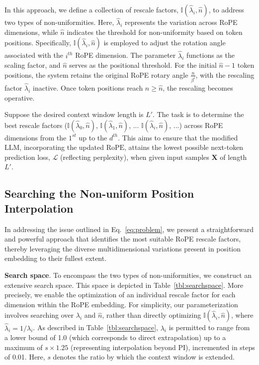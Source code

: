 In this approach, we define a collection of rescale factors, $\mathbb{I}(\hat{\lambda}_{i},\hat{n})$, to address two types of non-uniformities. Here, $\hat{\lambda}_{i}$ represents the variation across RoPE dimensions, while $\hat{n}$ indicates the threshold for non-uniformity based on token positions. Specifically, $\mathbb{I}(\hat{\lambda}_{i},\hat{n})$ is employed to adjust the rotation angle associated with the $i^{th}$ RoPE dimension. The parameter $\hat{\lambda}_{i}$ functions as the scaling factor, and $\hat{n}$ serves as the positional threshold. For the initial $\hat{n}-1$ token positions, the system retains the original RoPE rotary angle $\frac{n}{\beta^i}$, with the rescaling factor $\hat{\lambda}_{i}$ inactive. Once token positions reach $n \ge \hat{n}$, the rescaling becomes operative.

Suppose the desired context window length is $L'$. The task is to determine the best rescale factors ($\mathbb{I}(\hat{\lambda}_{0},\hat{n})$, $\mathbb{I}(\hat{\lambda}_{1},\hat{n})$, ... $\mathbb{I}(\hat{\lambda}_{i},\hat{n})$, ...) across RoPE dimensions from the $1^{st}$ up to the $d^{th}$. This aims to ensure that the modified $\text{LLM}$, incorporating the updated $\text{RoPE}$, attains the lowest possible next-token prediction loss, $\mathcal{L}$ (reflecting perplexity), when given input samples $\mathbf{X}$ of length $L'$.

\subsection{Searching the Non-uniform Position Interpolation}

In addressing the issue outlined in Eq.~\ref{eq:problem}, we present a straightforward and powerful approach that identifies the most suitable RoPE rescale factors, thereby leveraging the diverse multidimensional variations present in position embedding to their fullest extent.

\textbf{Search space}. To encompass the two types of non-uniformities, we construct an extensive search space. This space is depicted in Table~\ref{tbl:searchspace}. More precisely, we enable the optimization of an individual rescale factor for each dimension within the RoPE embedding. For simplicity, our parameterization involves searching over $\lambda_i$ and $\hat{n}$, rather than directly optimizing $\mathbb{I}(\hat{\lambda}_{i},\hat{n})$, where $\hat{\lambda}_{i}=1/\lambda_i$. As described in Table~\ref{tbl:searchspace}, $\lambda_i$ is permitted to range from a lower bound of 1.0 (which corresponds to direct extrapolation) up to a maximum of $s\times1.25$ (representing interpolation beyond PI), incremented in steps of 0.01. Here, $s$ denotes the ratio by which the context window is extended.

